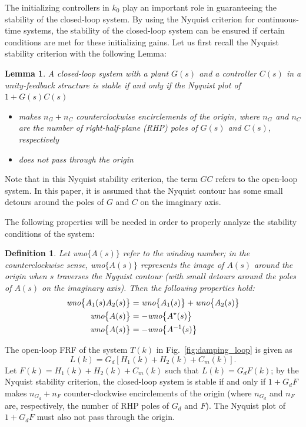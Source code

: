 \documentclass[a4paper, 10pt, conference]{ieeeconf}
\newtheorem{lemma}{Lemma}
\newtheorem{definition}{Definition}
\begin{document}
The initializing controllers in $k_0$ play an important role in guaranteeing the stability of the closed-loop system. By using the Nyquist criterion for continuous-time systems, the stability of the closed-loop system can be ensured if certain conditions are met for these initializing gains. Let us first recall the Nyquist stability criterion with the following Lemma:
\begin{lemma}
A closed-loop system with a plant $G(s)$ and a controller $C(s)$ in a unity-feedback structure is stable if and only if the Nyquist plot of $1+G(s)C(s)$
\begin{itemize}
\item makes $n_G + n_C$ counterclockwise encirclements of the origin, where $n_G$ and $n_C$ are the number of right-half-plane (RHP) poles of $G(s)$ and $C(s)$, respectively
\item does not pass through the origin
\end{itemize}
\end{lemma}
Note that in this Nyquist stability criterion, the term $GC$ refers to the open-loop system. In this paper, it is assumed that the Nyquist contour has some small detours around the poles of $G$ and $C$ on the imaginary axis.

The following properties will be needed in order to properly analyze the stability conditions of the system:
\begin{definition}
Let \emph{wno}$\{ A(s)\}$ refer to the winding number; in the counterclockwise sense, \emph{wno}$\{ A(s)\}$ represents the image of $A(s)$ around the origin when $s$ traverses the Nyquist contour (with small detours around the poles of $A(s)$ on the imaginary axis). Then the following properties hold:
\begin{align}
\emph{wno}\bigl\{ A_1(s)A_2(s) \bigr\} &= \emph{wno}\bigl\{ A_1(s) \bigr\} + \emph{wno}\bigl\{ A_2(s) \bigr\}  \label{eq:wno_add}\\ 
\emph{wno}\bigl\{ A(s)\bigr\} &= -\emph{wno}\bigl\{ A^{\star}(s)\bigr\} \label{eq:wno_conj} \\ 
\emph{wno}\bigl\{ A(s)\bigr\} &= -\emph{wno}\bigl\{ A^{-1}(s)\bigr\} \label{eq:wno_inv}
\end{align}
\end{definition}

The open-loop FRF of the system $T(k)$ in Fig.~\ref{fig:damping_loop} is given as $$L(k) = G_d[H_1(k)+H_2(k)+C_m(k)].$$ Let $F(k) = H_1(k)+H_2(k)+C_m(k)$ such that $L(k) = G_dF(k)$; by the Nyquist stability criterion, the closed-loop system is stable if and only if $1+G_dF$ makes $n_{G_d}+n_F$ counter-clockwise encirclements of the origin (where $n_{G_d}$ and $n_F$ are, respectively, the number of RHP poles of $G_d$ and $F$). The Nyquist plot of $1+G_dF$ must also not pass through the origin.
\end{document}
